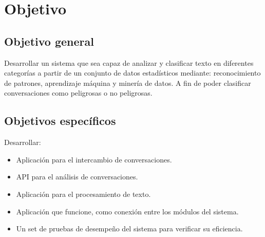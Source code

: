 \section{Objetivo}
\subsection{Objetivo general}
Desarrollar un sistema que sea capaz de analizar y clasificar texto en diferentes categor\'ias a partir de un conjunto de datos estad\'isticos mediante: reconocimiento de patrones, aprendizaje m\'aquina y miner\'ia de datos. A fin de poder clasificar conversaciones como peligrosas o no peligrosas.\\ 



\subsection{Objetivos espec\'ificos}
Desarrollar: \\ 

	\begin{itemize}
	\item Aplicaci\'on para el intercambio de conversaciones.
	\item API  para el an\'alisis de conversaciones.
	\item Aplicaci\'on para el procesamiento de texto.
	\item Aplicaci\'on que funcione, como conexi\'on entre los m\'odulos del sistema.
	\item Un set de pruebas de desempe\~no del sistema para verificar su eficiencia.
	\end{itemize}
